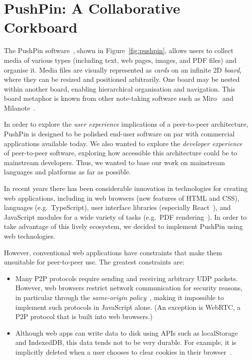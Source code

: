 \documentclass[sigplan,10pt]{acmart}
\begin{document}
\section{PushPin: A Collaborative Corkboard}

The PushPin software~\cite{PushPinSource}, shown in Figure~\ref{fig:pushpin}, allows users to collect media of various types (including text, web pages, images, and PDF files) and organise it.
Media files are visually represented as \emph{cards} on an infinite 2D \emph{board}, where they can be resized and positioned arbitrarily.
One board may be nested within another board, enabling hierarchical organisation and navigation.
This board metaphor is known from other note-taking software such as Miro~\cite{Miro} and Milanote~\cite{Milanote}.

In order to explore the \emph{user experience} implications of a peer-to-peer architecture, PushPin is designed to be polished end-user software on par with commercial applications available today.
We also wanted to explore the \emph{developer experience} of peer-to-peer software, exploring how accessible this architecture could be to mainstream developers.
Thus, we wanted to base our work on mainstream languages and platforms as far as possible.

In recent years there has been considerable innovation in technologies for creating web applications, including in web browsers (new features of HTML and CSS), languages (e.g.\ TypeScript), user interface libraries (especially React~\cite{React}), and JavaScript modules for a wide variety of tasks (e.g.\ PDF rendering~\cite{PDFjs}).
In order to take advantage of this lively ecosystem, we decided to implement PushPin using web technologies.

However, conventional web applications have constraints that make them unsuitable for peer-to-peer use.
The greatest constraints are:
\begin{itemize}
    \item Many P2P protocols require sending and receiving arbitrary UDP packets.
    However, web browsers restrict network communication for security reasons, in particular through the \emph{same-origin policy}~\cite{SameOrigin}, making it impossible to implement such protocols in JavaScript alone.
    (An exception is WebRTC, a P2P protocol that is built into web browsers.)
    \item Although web apps can write data to disk using APIs such as localStorage and IndexedDB, this data tends not to be very durable.
    For example, it is implicitly deleted when a user chooses to clear cookies in their browser~\cite{LocalStorageCleared}.
\end{itemize}
\end{document}
